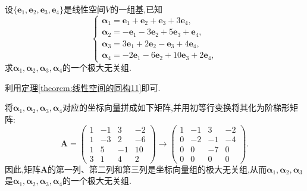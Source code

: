 \documentclass[../../main.tex]{subfiles}%
\begin{document}
\begin{example}
设\(\{\boldsymbol{e}_1,\boldsymbol{e}_2,\boldsymbol{e}_3,\boldsymbol{e}_4\}\)是线性空间\(V\)的一组基,已知
\[
\begin{cases}
\boldsymbol{\alpha}_1=\boldsymbol{e}_1+\boldsymbol{e}_2+\boldsymbol{e}_3 + 3\boldsymbol{e}_4,\\
\boldsymbol{\alpha}_2=-\boldsymbol{e}_1-3\boldsymbol{e}_2 + 5\boldsymbol{e}_3+\boldsymbol{e}_4,\\
\boldsymbol{\alpha}_3=3\boldsymbol{e}_1+2\boldsymbol{e}_2-\boldsymbol{e}_3 + 4\boldsymbol{e}_4,\\
\boldsymbol{\alpha}_4=-2\boldsymbol{e}_1-6\boldsymbol{e}_2 + 10\boldsymbol{e}_3+2\boldsymbol{e}_4,
\end{cases}
\]
求\(\boldsymbol{\alpha}_1,\boldsymbol{\alpha}_2,\boldsymbol{\alpha}_3,\boldsymbol{\alpha}_4\)的一个极大无关组.
\end{example}
\begin{note}
利用\hyperref[theorem:线性空间的同构11]{定理\ref{theorem:线性空间的同构11}}即可.
\end{note}
\begin{solution}
将\(\boldsymbol{\alpha}_1,\boldsymbol{\alpha}_2,\boldsymbol{\alpha}_3,\boldsymbol{\alpha}_4\)对应的坐标向量拼成如下矩阵,并用初等行变换将其化为阶梯形矩阵:
\[
\boldsymbol{A}=\begin{pmatrix}
1&-1&3&-2\\
1&-3&2&-6\\
1&5&-1&10\\
3&1&4&2
\end{pmatrix}\to\begin{pmatrix}
1&-1&3&-2\\
0&-2&-1&-4\\
0&0&-7&0\\
0&0&0&0
\end{pmatrix}.
\]
因此,矩阵\(\boldsymbol{A}\)的第一列、第二列和第三列是坐标向量组的极大无关组,从而\(\boldsymbol{\alpha}_1,\boldsymbol{\alpha}_2,\boldsymbol{\alpha}_3\)是\(\boldsymbol{\alpha}_1,\boldsymbol{\alpha}_2,\boldsymbol{\alpha}_3,\boldsymbol{\alpha}_4\)的一个极大无关组. 

\end{solution}
\end{document}
